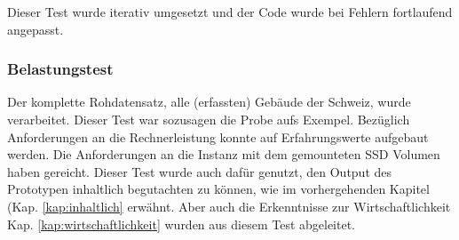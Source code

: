 Dieser Test wurde iterativ umgesetzt und der Code wurde bei Fehlern fortlaufend angepasst. 


\subsubsection{Belastungstest}\label{kap:belastungstest}
Der komplette Rohdatensatz, alle (erfassten) Gebäude der Schweiz, wurde verarbeitet. Dieser Test war sozusagen die Probe aufs Exempel. Bezüglich Anforderungen an die Rechnerleistung konnte auf Erfahrungswerte aufgebaut werden. Die Anforderungen an die Instanz mit dem gemounteten SSD Volumen haben gereicht. Dieser Test wurde auch dafür genutzt, den Output des Prototypen inhaltlich begutachten zu können, wie im vorhergehenden Kapitel (Kap. \ref{kap:inhaltlich} erwähnt. Aber auch die Erkenntnisse zur Wirtschaftlichkeit Kap. \ref{kap:wirtschaftlichkeit} wurden aus diesem Test abgeleitet.

